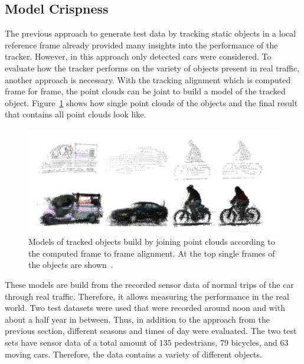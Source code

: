 \documentclass[twoside,a4paper,article]{combine}
\begin{document}
\subsection{Model Crispness}
\label{sub:model-crispness}
The previous approach to generate test data by tracking static
objects in a local reference frame already provided many insights into
the performance of the tracker. However, in this approach only
detected cars were considered. To evaluate how the tracker performs
on the variety of objects present in real traffic, another approach is
necessary. With the tracking alignment which is computed frame for
frame, the point clouds can be joint to build a model of the tracked
object. Figure~\ref{fig:build-models} shows how single point clouds of the objects and the final result
that contains all point clouds look like.
\begin{figure}
  \center
  \includegraphics[width=.7\linewidth]{build-models}
  \caption{Models of tracked objects build by joining point clouds
    according to the computed frame to frame alignment. At the top
    single frames of the objects are shown~\cite{paper}.}
  \label{fig:build-models}
\end{figure}
These models are build from the recorded sensor data of normal trips
of the car through real traffic. Therefore, it allows measuring the
performance in the real world. Two test datasets were used that were
recorded around noon and with about a half year in between. Thus, in
addition to the approach from the previous section, different seasons
and times of day were evaluated. The two test sets have sensor data of
a total
amount of $135$ pedestrians, $79$ bicycles, and $63$ moving
cars. Therefore, the data contains a variety of different objects.
\end{document}
